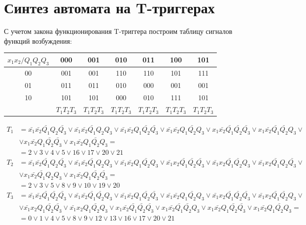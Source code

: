 \documentclass[listings]{labreport}
\begin{document}
\section*{Синтез автомата на T-триггерах}

С учетом закона функционирования T-триггера построим таблицу
сигналов функций возбуждения:

\begin{tabular}{|*{7}{c|}}
\hline
$x_1x_2/Q_1Q_2Q_3$ & 000 & 001 & 010 & 011 & 100 & 101\\\hline
00 & 001 & 001 & 110 & 110 & 101 & 111\\\hline
01 & 011 & 011 & 010 & 000 & 001 & 001\\\hline
10 & 101 & 101 & 000 & 010 & 111 & 101\\\hline
 & $T_1T_2T_3$ & $T_1T_2T_3$ & $T_1T_2T_3$ & $T_1T_2T_3$ & $T_1T_2T_3$ & $T_1T_2T_3$\\\hline
\end{tabular}

\begin{align*}
T_1 & = \bar{x_1}\bar{x_2}\bar{Q_1}Q_2\bar{Q_3} \lor \bar{x_1}\bar{x_2}\bar{Q_1}Q_2Q_3 \lor \bar{x_1}\bar{x_2}Q_1\bar{Q_2}\bar{Q_3} \lor \bar{x_1}\bar{x_2}Q_1\bar{Q_2}Q_3 \lor x_1\bar{x_2}\bar{Q_1}\bar{Q_2}\bar{Q_3} \lor x_1\bar{x_2}\bar{Q_1}\bar{Q_2}Q_3 \lor \\ & \lor x_1\bar{x_2}Q_1\bar{Q_2}\bar{Q_3} \lor x_1\bar{x_2}Q_1\bar{Q_2}Q_3 = \\ & = 2 \lor 3 \lor 4 \lor 5 \lor 16 \lor 17 \lor 20 \lor 21 \\
T_2 & = \bar{x_1}\bar{x_2}\bar{Q_1}Q_2\bar{Q_3} \lor \bar{x_1}\bar{x_2}\bar{Q_1}Q_2Q_3 \lor \bar{x_1}\bar{x_2}Q_1\bar{Q_2}Q_3 \lor \bar{x_1}x_2\bar{Q_1}\bar{Q_2}\bar{Q_3} \lor \bar{x_1}x_2\bar{Q_1}\bar{Q_2}Q_3 \lor \bar{x_1}x_2\bar{Q_1}Q_2\bar{Q_3} \lor \\ & \lor x_1\bar{x_2}\bar{Q_1}Q_2Q_3 \lor x_1\bar{x_2}Q_1\bar{Q_2}\bar{Q_3}   = \\ & = 2 \lor 3 \lor 5 \lor 8 \lor 9 \lor 10 \lor 19 \lor 20 \\
T_3 & = \bar{x_1}\bar{x_2}\bar{Q_1}\bar{Q_2}\bar{Q_3} \lor \bar{x_1}\bar{x_2}\bar{Q_1}\bar{Q_2}Q_3 \lor \bar{x_1}\bar{x_2}Q_1\bar{Q_2}\bar{Q_3} \lor \bar{x_1}\bar{x_2}Q_1\bar{Q_2}Q_3 \lor \bar{x_1}x_2\bar{Q_1}\bar{Q_2}\bar{Q_3} \lor \bar{x_1}x_2\bar{Q_1}\bar{Q_2}Q_3 \lor \\ & \lor \bar{x_1}x_2Q_1\bar{Q_2}\bar{Q_3} \lor \bar{x_1}x_2Q_1\bar{Q_2}Q_3 \lor x_1\bar{x_2}\bar{Q_1}\bar{Q_2}\bar{Q_3} \lor x_1\bar{x_2}\bar{Q_1}\bar{Q_2}Q_3 \lor x_1\bar{x_2}Q_1\bar{Q_2}\bar{Q_3} \lor x_1\bar{x_2}Q_1\bar{Q_2}Q_3 = \\ & = 0 \lor 1 \lor 4 \lor 5 \lor 8 \lor 9 \lor 12 \lor 13 \lor 16 \lor 17 \lor 20 \lor 21
\end{align*}
\end{document}
